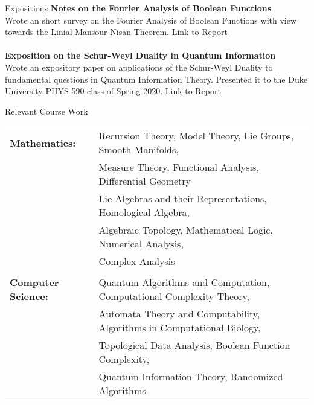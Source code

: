 \documentclass{resume} %
\begin{document}
\begin{rSection}{Expositions}
{\bf Notes on the Fourier Analysis of Boolean Functions}
\hfill \\
Wrote an short survey on the Fourier Analysis of Boolean Functions with view towards the Linial-Mansour-Nisan Theorem.
\href{https://github.com/ekim1919/Research/blob/master/CS590/EdwardKimPaper.pdf}{Link to Report}
\\
\\
{\bf Exposition on the Schur-Weyl Duality in Quantum Information} \hfill \\
Wrote an expository paper on applications of the Schur-Weyl Duality to fundamental questions in Quantum Information Theory. Presented it to the Duke University PHYS 590 class of Spring 2020.
\href{https://github.com/ekim1919/Research/blob/master/P590/final.pdf}{Link to Report}
\end{rSection}

\begin{rSection}{Relevant Course Work}

\begin{tabular}{ @{} >{\bfseries}l @{\hspace{6ex}} l }
Mathematics:
& Recursion Theory, Model Theory, Lie Groups, Smooth Manifolds,  \\
& Measure Theory, Functional Analysis, Differential Geometry   \\
& Lie Algebras and their Representations, Homological Algebra, \\
& Algebraic Topology, Mathematical Logic, Numerical Analysis, \\
& Complex Analysis\\
\\
Computer Science: & Quantum Algorithms and Computation, Computational Complexity Theory, \\
& Automata Theory and Computability, Algorithms in Computational Biology, \\
& Topological Data Analysis, Boolean Function Complexity, \\
& Quantum Information Theory, Randomized Algorithms  \\
\end{tabular}
\end{rSection}
\end{document}
